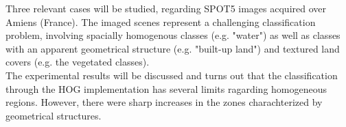 Three relevant cases will be studied, regarding SPOT5 images acquired over Amiens (France). The imaged scenes represent a challenging classification problem, involving spacially homogenous classes (e.g. "water") as well as classes with an apparent geometrical structure (e.g. "built-up land") and textured land covers (e.g. the vegetated classes).\\
The experimental results will be discussed and turns out that the classification through the HOG implementation has several limits ragarding homogeneous regions. However, there were sharp increases in the zones charachterized by geometrical structures.